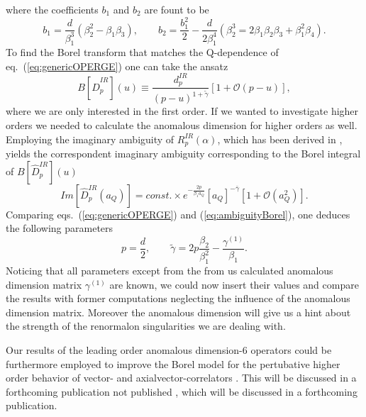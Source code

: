 where the coefficients $b_1$ and $b_2$ are fount to be
\begin{equation}
	b_1 = \frac{d}{\beta_1^3} (\beta_2^2 - \beta_1 \beta_3), \qquad b_2 = \frac{b_1^2}{2} - \frac{d}{2\beta_1^4}(\beta^3_2 = 2 \beta_1\beta_2\beta_3 + \beta_1^2\beta_4 ).
\end{equation}
To find the Borel transform that matches the Q-dependence of eq.~(\ref{eq:genericOPERGE}) one can take the ansatz
\begin{equation}
	B[\hat D^{IR}_p](u) \equiv \frac{d^{IR}_p}{(p-u)^{1+\tilde \gamma}} \left[1 + \mathcal{O}(p-u) \right],
\end{equation}
where we are only interested in the first order. If we wanted to investigate higher orders we needed to calculate the anomalous dimension for higher orders as well. Employing the imaginary ambiguity of $R^{IR}_p(\alpha)$, which has been derived in \cite{bj08}, yields the correspondent imaginary ambiguity corresponding to the Borel integral of $B[\hat D^{IR}_p](u)$ 
\begin{equation}
	\label{eq:ambiguityBorel}
	Im\left[\hat D^{IR}_p(a_Q)\right] = const. \times e^{-\frac{2p}{\beta_1a_Q}}[a_Q]^{-\bar \gamma} \left[1 + \mathcal{O}(a_Q^2)\right].
\end{equation}
Comparing eqs.~(\ref{eq:genericOPERGE}) and (\ref{eq:ambiguityBorel}), one deduces the following parameters
\begin{equation}
	p = \frac{d}{2}, \qquad \tilde \gamma = 2p \frac{\beta_2}{\beta_1^2} - \frac{\gamma^{(1)}}{\beta_1}.
\end{equation}
Noticing that all parameters except from the from us calculated anomalous dimension matrix $\gamma^{(1)}$ are known, we could now insert their values and compare the results with former computations neglecting the influence of the anomalous dimension matrix. Moreover the anomalous dimension will give us a hint about the strength of the renormalon singularities we are dealing with. 
\par
Our results of the leading order anomalous dimension-6 operators could be furthermore employed to improve the Borel model for the pertubative higher order behavior of vector- and axialvector-correlators \cite{bj08}. This will be discussed in a forthcoming publication not published \cite{bhj15}, which will be discussed in a forthcoming publication.   
